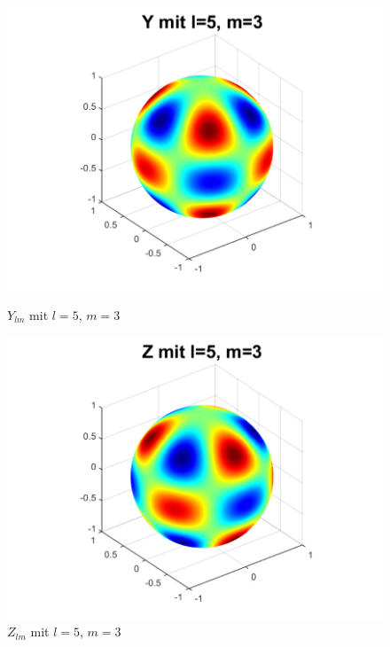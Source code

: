 \begin{refsection}
\begin{figure}
\begin{minipage}[hbt]{0.4\textwidth}
\centering
\includegraphics[width=1\textwidth]{kugel/ylm/a_5_3.pdf}
\caption{$Y_{lm}$ mit $l=5$, $m=3$}
\label{skript:ylm l=5 m=3}
\end{minipage}
\hfill
\begin{minipage}[hbt]{0.4\textwidth}
\centering
\includegraphics[width=1\textwidth]{kugel/ylm/b_5_3.pdf}
\caption{$Z_{lm}$ mit $l=5$, $m=3$}
\label{skript:zlm l=5 m=3}
\end{minipage}
\begin{minipage}[hbt]{0.4\textwidth}
\centering

\end{minipage}
\end{figure}
\end{refsection}
